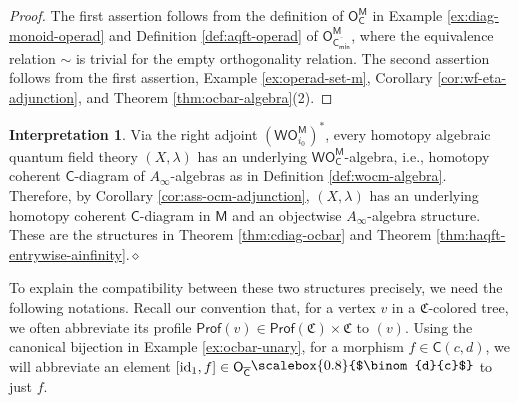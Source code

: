 \documentclass[11pt]{amsbook}
\numberwithin{section}{chapter}
\numberwithin{subsection}{section}
\numberwithin{equation}{section}
\theoremstyle{plain}
\theoremstyle{definition}
\newtheorem{interpretation}[equation]{Interpretation}
\newcommand{\colorc}{\mathfrak{C}}
\newcommand{\Prof}{\mathsf{Prof}}
\newcommand{\Profc}{\Prof(\colorc)}
\newcommand{\Profcc}{\Profc \times \colorc}
\newcommand{\profofv}{\Prof(v)}
\newcommand{\C}{\mathsf{C}}
\newcommand{\M}{\mathsf{M}}
\renewcommand{\O}{\mathsf{O}}
\newcommand{\Otom}{\O^{\M}}
\newcommand{\W}{\mathsf{W}}
\newcommand{\id}{\mathrm{id}}
\newcommand{\dqed}{\hfill$\diamond$}
\newcommand{\Cbar}{\overline{\C}}
\newcommand{\Cbarmin}{\overline{\C_{\mathsf{min}}}}
\newcommand{\Ocm}{\O_{\C}^{\M}}
\newcommand{\Ocbar}{\O_{\Cbar}}
\newcommand{\Ocbarmin}{\O_{\Cbarmin}}
\newcommand{\Ocbarminm}{\Ocbarmin^{\M}}
\newcommand{\wom}{\W\Otom}
\newcommand{\wocm}{\W\Ocm}
\newcommand{\smallprof}[1]
{\raisebox{.05cm}{\scalebox{0.8}{#1}}}
\newcommand{\dc}{\smallprof{$\binom{d}{c}$}}
\begin{document}
\begin{proof} The first assertion follows from the definition of $\Ocm$ in Example \ref{ex:diag-monoid-operad} and Definition \ref{def:aqft-operad} of $\Ocbarminm$, where the equivalence relation $\sim$ is trivial for the empty orthogonality relation.  The second assertion follows from the first assertion, Example \ref{ex:operad-set-m}, Corollary \ref{cor:wf-eta-adjunction}, and Theorem \ref{thm:ocbar-algebra}(2).
\end{proof}

\begin{interpretation} Via the right adjoint $(\wom_{i_0})^*$, every homotopy algebraic quantum field theory $(X,\lambda)$ has an underlying $\wocm$-algebra, i.e., homotopy coherent $\C$-diagram of $A_\infty$-algebras as in Definition \ref{def:wocm-algebra}.  Therefore, by Corollary \ref{cor:ass-ocm-adjunction}, $(X,\lambda)$ has an underlying homotopy coherent $\C$-diagram in $\M$ and an objectwise $A_\infty$-algebra structure.  These are the structures in Theorem \ref{thm:cdiag-ocbar} and Theorem \ref{thm:haqft-entrywise-ainfinity}.\dqed
\end{interpretation}

To explain the compatibility between these two structures precisely, we need the following notations.  Recall our convention that, for a vertex $v$ in a $\colorc$-colored tree, we often abbreviate its profile $\profofv \in \Profcc$ to  $(v)$.  Using the canonical bijection in Example \ref{ex:ocbar-unary}, for a morphism $f \in \C(c,d)$, we will abbreviate an element $[\id_1,f] \in \Ocbar\dc$ to just $f$.
\end{document}

